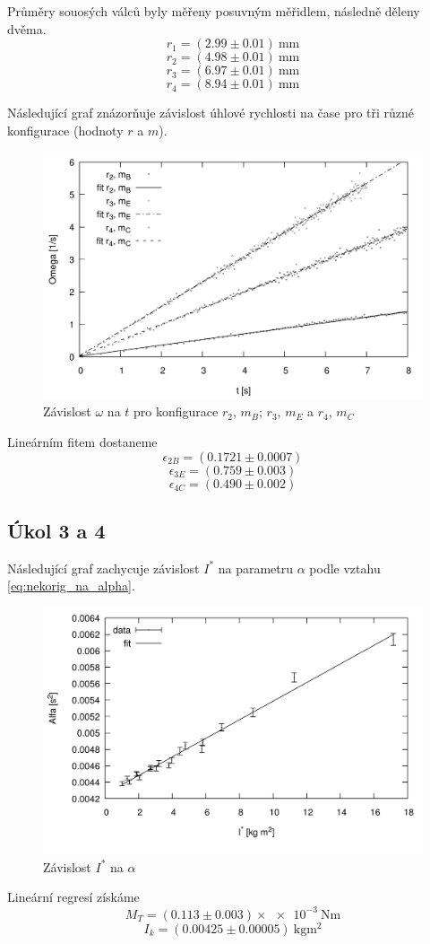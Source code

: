\documentclass[protokol.tex]{subfiles}
\begin{document}
Průměry souosých válců byly měřeny posuvným měřidlem, následně děleny dvěma.
$$ r_1 = (2.99 \pm 0.01) \ \si{\milli\metre} $$
$$ r_2 = (4.98 \pm 0.01) \ \si{\milli\metre} $$
$$ r_3 = (6.97 \pm 0.01) \ \si{\milli\metre} $$
$$ r_4 = (8.94 \pm 0.01) \ \si{\milli\metre} $$

\newpage

Následující graf znázorňuje závislost úhlové rychlosti na čase pro tři různé konfigurace (hodnoty $r$ a $m$).
\begin{figure}[H]
\centering
\includegraphics[resolution=350]{plot/out}
\caption{Závislost $\omega$ na $t$ pro konfigurace $r_2$, $m_B$; $r_3$, $m_E$ a $r_4$, $m_C$}
\end{figure}

Lineárním fitem dostaneme 
$$ \epsilon_{2B} = (0.1721 \pm 0.0007) $$
$$ \epsilon_{3E} = (0.759  \pm 0.003 ) $$
$$ \epsilon_{4C} = (0.490  \pm 0.002 ) $$

\newpage

\subsection*{Úkol 3 a 4}
Následující graf zachycuje závislost $I^*$ na parametru $\alpha$ podle vztahu \eqref{eq:nekorig_na_alpha}.
\begin{figure}[H]
\centering
\includegraphics[resolution=350]{plot/IaM.png}
\caption{Závislost $I^*$ na $\alpha$}
\end{figure}

Lineární regresí získáme
$$ M_T = (0.113 \pm 0.003) \times \num{e-3} \ \si{\newton\metre} $$
$$ I_k = (0.00425 \pm 0.00005) \ \si{\kilo\gram\metre\squared} $$
\end{document}
